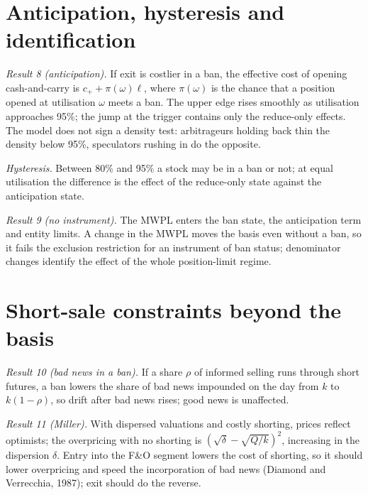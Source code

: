 \section{Anticipation, hysteresis and identification}
\emph{Result 8 (anticipation).} If exit is costlier in a ban, the effective cost of opening cash-and-carry is
$c_++\pi(\omega)\ell$, where $\pi(\omega)$ is the chance that a position opened at utilisation $\omega$ meets a ban. The upper
edge rises smoothly as utilisation approaches 95\%; the jump at the trigger contains only the reduce-only effects. The model
does not sign a density test: arbitrageurs holding back thin the density below 95\%, speculators rushing in do the opposite.

\emph{Hysteresis.} Between 80\% and 95\% a stock may be in a ban or not; at equal utilisation the difference is the effect
of the reduce-only state against the anticipation state.

\emph{Result 9 (no instrument).} The MWPL enters the ban state, the anticipation term and entity limits. A change in the
MWPL moves the basis even without a ban, so it fails the exclusion restriction for an instrument of ban status;
denominator changes identify the effect of the whole position-limit regime.

\section{Short-sale constraints beyond the basis}
\emph{Result 10 (bad news in a ban).} If a share $\rho$ of informed selling runs through short futures, a ban lowers the
share of bad news impounded on the day from $k$ to $k(1-\rho)$, so drift after bad news rises; good news is unaffected.

\emph{Result 11 (Miller).} With dispersed valuations and costly shorting, prices reflect optimists; the overpricing with no
shorting is $(\sqrt{\delta}-\sqrt{Q/k})^2$, increasing in the dispersion $\delta$. Entry into the F\&O segment lowers the cost
of shorting, so it should lower overpricing and speed the incorporation of bad news (Diamond and Verrecchia, 1987); exit
should do the reverse.

